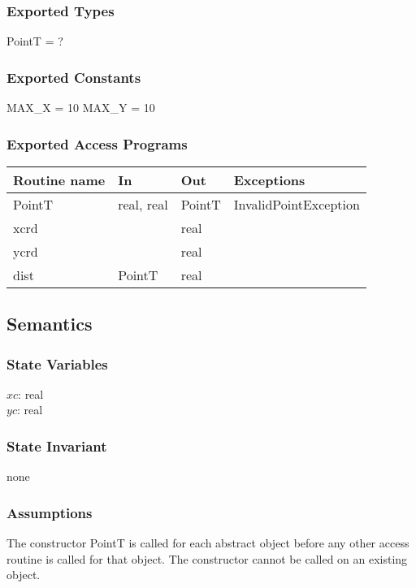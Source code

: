\documentclass[12pt]{article}
\begin{document}
\subsubsection* {Exported Types}

PointT = ?

\subsubsection* {Exported Constants}

MAX\_X = 10
MAX\_Y = 10

\subsubsection* {Exported Access Programs}

\begin{tabular}{| l | l | l | l |}
\hline
\textbf{Routine name} & \textbf{In} & \textbf{Out} & \textbf{Exceptions}\\
\hline
PointT & real, real & PointT & InvalidPointException\\
\hline
xcrd & ~ & real & ~\\
\hline
ycrd & ~ & real & ~\\
\hline
dist & PointT & real & ~\\
\hline
\end{tabular}

\subsection* {Semantics}

\subsubsection* {State Variables}

$xc$: real\\
$yc$: real

\subsubsection* {State Invariant}

none

\subsubsection* {Assumptions}
The constructor PointT is called for each abstract object before any other access routine is called for that
object.  The constructor cannot be called on an existing object.
\end{document}
